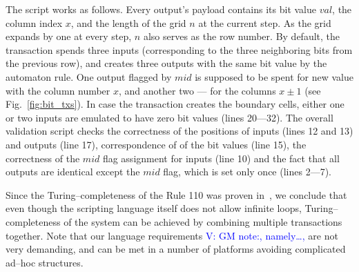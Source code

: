 \documentclass[runningheads]{llncs}
\newcommand{\dnote}[1]{\textcolor{red}{D: {#1}}}
\newcommand{\vk}[1]{\textcolor{blue}{V: {#1}}}
\newcommand{\payload}{\textit{payload}}
\newcommand{\script}{\textit{script}}
\begin{document}
	The script works as follows. Every output's payload contains its bit value
    $val$, 
    the column index $x$, and the length of the grid $n$ at the current step.
    As the
    grid expands by one at every step, $n$ also serves as the row number. By
    default, the transaction spends three inputs (corresponding to the three
    neighboring bits from the previous row), and creates three outputs with the same
    bit value by the automaton rule. One output flagged by $mid$ is supposed to be
    spent for new value with the column number $x$, and another two --- for the
    columns $x\pm 1$ (see Fig.~\ref{fig:bit_txs}). In case the transaction creates the
    boundary cells, either one or two inputs are emulated to have zero bit values
    (lines 20---32).  The overall validation script checks the correctness of the
    positions of inputs (lines 12 and 13) and outputs (line 17), correspondence of
    of the bit values (line 15), the correctness of the $mid$  flag assignment for
    inputs (line 10) and the fact that all outputs are identical except the $mid$
    flag, which is set only once (lines 2---7).

    Since the Turing--completeness of the Rule 110 was proven
    in~\cite{cook2004universality}, we conclude that even though the scripting
    language itself does not allow infinite loops, Turing--completeness of the
    system can be achieved by combining multiple transactions together. Note
    that our language requirements \vk{GM note:, namely\ldots,} are not very demanding, and can be met in a 
    number of platforms avoiding complicated ad--hoc structures.
\end{document}
